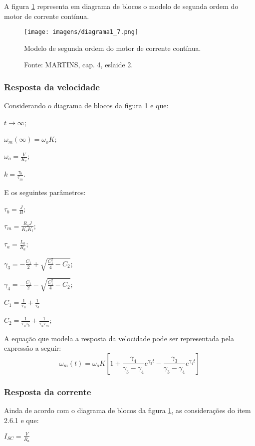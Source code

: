 A figura \ref{fig:D1_7} representa em diagrama de blocos o modelo de segunda ordem do motor de corrente contínua.

\begin{figure}[ht!]
\center
\texttt{[image: imagens/diagrama1\_7.png]}
\caption{\label{fig:D1_7} Modelo de segunda ordem do motor de corrente contínua.}
\caption*{Fonte: MARTINS, cap. 4, eslaide 2.}
\end{figure}


\subsubsection{Resposta da velocidade}

Considerando o diagrama de blocos da figura \ref{fig:D1_7} e  que:

$t \rightarrow \infty$;

$\omega_{m}(\infty) = \omega_{o}K$;

$\omega_{o} = \frac{V}{K_{e}}$;

$k = \frac{\tau_{b}}{\tau_{m}}$.

E os seguintes parâmetros:

$\tau_{b} = \frac{J}{B}$;

$\tau_{m} = \frac{R_{a}J}{K_{e}K_{t}}$;

$\tau_{a} = \frac{L_{a}}{R_{a}}$;

$\gamma_{3} = -\frac{C_{1}}{2} + \sqrt{\frac{C_{1}^{2}}{4} - C_{2}} $;

$\gamma_{4} = -\frac{C_{1}}{2} - \sqrt{\frac{C_{1}^{2}}{4} - C_{2}} $;

$C_{1} = \frac{1}{\tau_{a}} + \frac{1}{\tau_{b}}$

$C_{2} = \frac{1}{\tau_{a}\tau_{b}} + \frac{1}{\tau_{a}\tau_{m}}$;

A equação que modela a resposta da velocidade pode ser representada pela expressão a seguir:
\[\omega_{m}(t) = \omega_{o}K\left[1 + \frac{\gamma_{4}}{\gamma_{3} - \gamma_{4}}e^{\gamma_{3}t} - \frac{\gamma_{3}}{\gamma_{3} - \gamma_{4}}e^{\gamma_{4}t}\right]\]

\subsubsection{Resposta da corrente}

Ainda de acordo com o diagrama de blocos da figura \ref{fig:D1_7}, as considerações do item 2.6.1 e que:

$I_{SC} = \frac{V}{R_{a}}$


